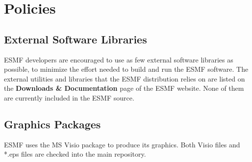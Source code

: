 
\section{Policies}

\subsection{External Software Libraries}
\label{sec:lib}

ESMF developers are encouraged to use as few external
software libraries as possible, to minimize the effort
needed to build and run the ESMF software.  The external
utilities and libraries that the ESMF 
distribution relies on are listed on the {\bf Downloads \&
Documentation} page of the ESMF website.  None of them are 
currently included in the ESMF source.

\subsection{Graphics Packages}

ESMF uses the MS Visio package to produce its graphics.
Both Visio files and *.eps files are checked into the 
main repository.




